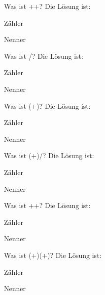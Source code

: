 \documentclass{ximera}
\begin{document}
\begin{shuffle}
\begin{question}
Was ist ++?
Die Lösung ist:
\begin{solution}
Zähler 
\end{solution}
\begin{solution}
Nenner 
\end{solution}
\end{question}


\begin{question}
Was ist /?
Die Lösung ist:
\begin{solution}
Zähler 
\end{solution}
\begin{solution}
Nenner 
\end{solution}
\end{question}


\begin{question}
Was ist \cdot(+)?
Die Lösung ist:
\begin{solution}
Zähler 
\end{solution}
\begin{solution}
Nenner 
\end{solution}
\end{question}


\begin{question}
Was ist (+)/?
Die Lösung ist:
\begin{solution}
Zähler 
\end{solution}
\begin{solution}
Nenner 
\end{solution}
\end{question}


\begin{question}
Was ist ++?
Die Lösung ist:
\begin{solution}
Zähler 
\end{solution}
\begin{solution}
Nenner 
\end{solution}
\end{question}


\begin{question}
Was ist (+)\cdot(+)?
Die Lösung ist:
\begin{solution}
Zähler 
\end{solution}
\begin{solution}
Nenner 
\end{solution}
\end{question}



\end{shuffle}
\end{document}
